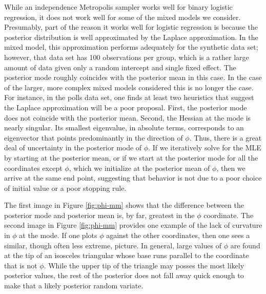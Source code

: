 \documentclass[11pt]{article}
\begin{document}
While an independence Metropolis sampler works well for binary logistic
regression, it does not work well for some of the mixed models we consider.
Presumably, part of the reason it works well for logistic regression is because
the posterior distribution is well approximated by the Laplace approximation.
In the mixed model, this approximation performs adequately for the synthetic
data set; however, that data set has 100 observations per group, which is a
rather large amount of data given only a random intercept and single fixed
effect.  The posterior mode roughly coincides with the posterior mean in this
case.
% 
In the case of the larger, more complex mixed models considered this is no
longer the case.  For instance, in the polls data set, one finds at least two
heuristics that suggest the Laplace approximation will be a poor proposal.
First, the posterior mode does not coincide with the posterior mean.  Second,
the Hessian at the mode is nearly singular.  Its smallest eigenvalue, in
absolute terms, corresponds to an eigenvector that points predominantly in the
direction of $\phi$.  Thus, there is a great deal of uncertainty in the
posterior mode of $\phi$.  If we iteratively solve for the MLE by starting at
the posterior mean, or if we start at the posterior mode for all the coordinates
except $\phi$, which we initialize at the posterior mean of $\phi$, then we
arrive at the same end point, suggesting that behavior is not due to a poor
choice of initial value or a poor stopping rule.

The first image in Figure \ref{fig:phi-mm} shows that the difference between the
posterior mode and posterior mean is, by far, greatest in the $\phi$ coordinate.
The second image in Figure \ref{fig:phi-mm} provides one example of the lack of
curvature in $\phi$ at the mode.  If one plots $\phi$ against the other
coordinates, then one sees a similar, though often less extreme, picture.  In
general, large values of $\phi$ are found at the tip of an isosceles triangular
whose base runs parallel to the coordinate that is not $\phi$.  While the upper
tip of the triangle may posses the most likely posterior values, the rest of the
posterior does not fall away quick enough to make that a likely posterior random
variate.
\end{document}
